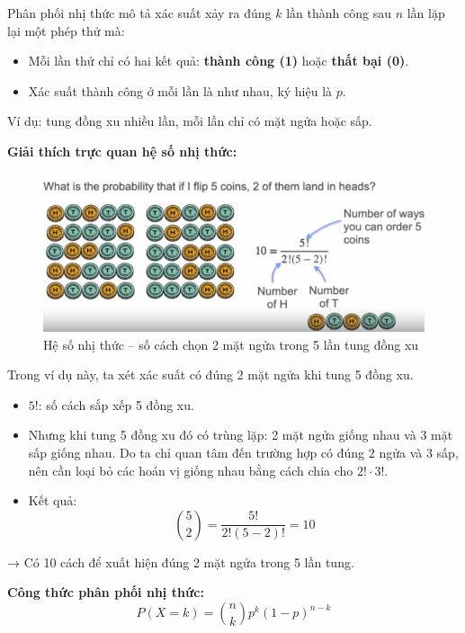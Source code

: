 \documentclass[11pt]{article}
\begin{document}
Phân phối nhị thức mô tả xác suất xảy ra đúng $k$ lần thành công sau $n$ lần lặp lại một phép thử mà:
\begin{itemize}
    \item Mỗi lần thử chỉ có hai kết quả: \textbf{thành công (1)} hoặc \textbf{thất bại (0)}.
    \item Xác suất thành công ở mỗi lần là như nhau, ký hiệu là $p$.
\end{itemize}

Ví dụ: tung đồng xu nhiều lần, mỗi lần chỉ có mặt ngửa hoặc sấp.

\vspace{1em}

\textbf{Giải thích trực quan hệ số nhị thức:}

\begin{figure}[H]
    \centering
    \includegraphics[width=0.9\linewidth]{images/binomial_coefficient.png}
    \caption{Hệ số nhị thức – số cách chọn 2 mặt ngửa trong 5 lần tung đồng xu}
\end{figure}

Trong ví dụ này, ta xét xác suất có đúng 2 mặt ngửa khi tung 5 đồng xu.

\begin{itemize}
    \item $5!$: số cách sắp xếp 5 đồng xu.
    \item Nhưng khi tung 5 đồng xu đó có trùng lặp: 2 mặt ngửa giống nhau và 3 mặt sấp giống nhau. Do ta chỉ quan tâm đến trường hợp có đúng 2 ngửa và 3 sấp, nên cần loại bỏ các hoán vị giống nhau bằng cách chia cho $2! \cdot 3!$.
    \item Kết quả:
    \[
    \binom{5}{2} = \frac{5!}{2!(5-2)!} = 10
    \]
\end{itemize}

→ Có 10 cách để xuất hiện đúng 2 mặt ngửa trong 5 lần tung.

\vspace{1em}

\textbf{Công thức phân phối nhị thức:}
\[
P(X = k) = \binom{n}{k} p^k (1 - p)^{n - k}
\]
\end{document}
